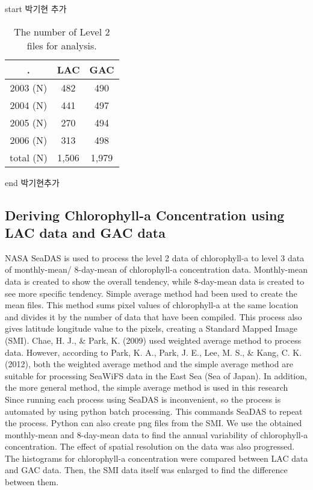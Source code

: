 start 박기현 추가
 \begin{table}[h]
	\caption{The number of Level 2 files for analysis.}
	\label{data_information}
	\centering
	\begin{tabular}{c{3cm} | c{3cm} | c{3cm}}
		\hline \setlength{\arrayrulewidth}{3.5pt}. 
			& LAC  & GAC \\ \hline
		2003 (N) & 482 & 490 \\ \hline
		2004 (N) & 441 & 497 \\ \hline
		2005 (N) & 270 & 494 \\ \hline
		2006 (N) & 313 & 498 \\ \hline
		total (N) & 1,506 & 1,979 \\ \hline
	\end{tabular}
\end{table}
end 박기현추가

\hfill \break


 \subsection{Deriving Chlorophyll-a Concentration using LAC data and GAC data}
 
  NASA SeaDAS is used to process the level 2 data of chlorophyll-a to level 3 data of monthly-mean/ 8-day-mean of chlorophyll-a concentration data. Monthly-mean data is created to show the overall tendency, while 8-day-mean data is created to see more specific tendency. Simple average method had been used to create the mean files. This method sums pixel values of chlorophyll-a at the same location and divides it by the number of data that have been compiled. This process also gives latitude longitude value to the pixels, creating a Standard Mapped Image (SMI). Chae, H. J., \& Park, K. (2009) used weighted average method to process data. However, according to Park, K. A., Park, J. E., Lee, M. S., \& Kang, C. K. (2012), both the weighted average method and the simple average method are suitable for processing SeaWiFS data in the East Sea (Sea of Japan). In addition, the more general method, the simple average method is used in this research
 Since running each process using SeaDAS is inconvenient, so the process is automated by using python batch processing. This commands SeaDAS to repeat the process. Python can also create png files from the SMI. We use the obtained monthly-mean and 8-day-mean data to find the annual variability of chlorophyll-a concentration.
 The effect of spatial resolution on the data was also progressed. The histograms for chlorophyll-a concentration were compared between LAC data and GAC data. Then, the SMI data itself was enlarged to find the difference between them.
 
 
 